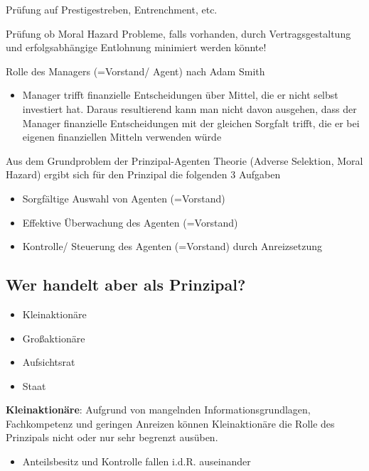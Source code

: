 \documentclass[
]{article}
\providecommand{\tightlist}{%
  \setlength{\itemsep}{0pt}\setlength{\parskip}{0pt}}
\begin{document}
Prüfung auf Prestigestreben, Entrenchment, etc.

Prüfung ob Moral Hazard Probleme, falls vorhanden, durch
Vertragsgestaltung und erfolgsabhängige Entlohnung minimiert werden
könnte!

Rolle des Managers (=Vorstand/ Agent) nach Adam Smith

\begin{itemize}
\tightlist
\item
  Manager trifft finanzielle Entscheidungen über Mittel, die er nicht
  selbst investiert hat. Daraus resultierend kann man nicht davon
  ausgehen, dass der Manager finanzielle Entscheidungen mit der gleichen
  Sorgfalt trifft, die er bei eigenen finanziellen Mitteln verwenden
  würde
\end{itemize}

Aus dem Grundproblem der Prinzipal-Agenten Theorie (Adverse Selektion,
Moral Hazard) ergibt sich für den Prinzipal die folgenden 3 Aufgaben

\begin{itemize}
\tightlist
\item
  Sorgfältige Auswahl von Agenten (=Vorstand)
\item
  Effektive Überwachung des Agenten (=Vorstand)
\item
  Kontrolle/ Steuerung des Agenten (=Vorstand) durch Anreizsetzung
\end{itemize}

\hypertarget{wer-handelt-aber-als-prinzipal}{%
\subsection{Wer handelt aber als
Prinzipal?}\label{wer-handelt-aber-als-prinzipal}}

\begin{itemize}
\tightlist
\item
  Kleinaktionäre
\item
  Großaktionäre
\item
  Aufsichtsrat
\item
  Staat
\end{itemize}

\textbf{Kleinaktionäre}: Aufgrund von mangelnden Informationsgrundlagen,
Fachkompetenz und geringen Anreizen können Kleinaktionäre die Rolle des
Prinzipals nicht oder nur sehr begrenzt ausüben.

\begin{itemize}
\tightlist
\item
  Anteilsbesitz und Kontrolle fallen i.d.R. auseinander
\end{itemize}
\end{document}
